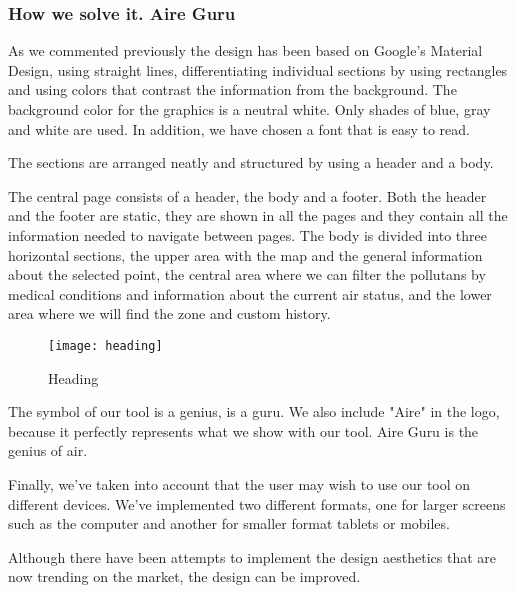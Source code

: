 \subsubsection*{How we solve it. Aire Guru} 
As we commented previously the design has been based on Google's Material Design, using straight lines, differentiating individual sections by using rectangles and using colors that contrast the information from the background.
The background color for the graphics is a neutral white. Only shades of blue, gray and white are used. In addition, we have chosen a font that is easy to read.

The sections are arranged neatly and structured by using a header and a body.

The central page consists of a header, the body and a footer. Both the header and the footer are static,
they are shown in all the pages and they contain all the information needed to navigate between pages.
The body is divided into three horizontal sections, the upper area with the map and the general information about the selected point,
the central area where we can filter the pollutans by medical conditions and information about the current air status, and the
lower area where we will find the zone and custom history.

\begin{figure}[ht]
    \centering
    \texttt{[image: heading]}
    \caption{Heading}
\end{figure}
 
    The symbol of our tool is a genius, is a guru. We also include "Aire" in the logo, because it perfectly represents 
    what we show with our tool. Aire Guru is the genius of air.
    
    Finally, we've taken into account that the user may wish to use our tool on different devices. We've implemented
    two different formats, one for larger screens such as the computer and another for smaller format tablets or mobiles.
\begin{itemize}
    \done
    \crossed Although there have been attempts to implement the design aesthetics that are now trending on the market, the design can be improved.
    
\end{itemize}